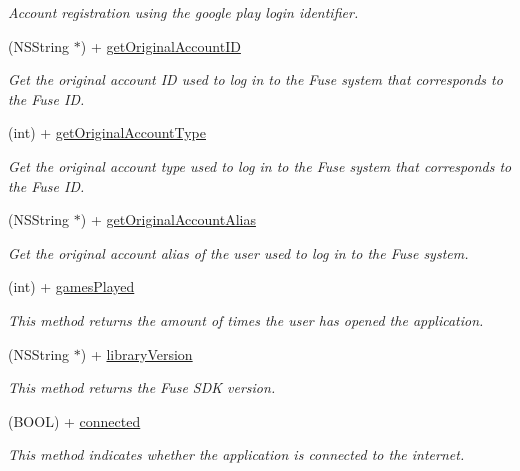 \begin{DoxyCompactItemize}
\begin{DoxyCompactList}\small\item\em Account registration using the google play login identifier. \end{DoxyCompactList}\item 
(N\+S\+String $\ast$) + \hyperlink{interface_fuse_s_d_k_a49b43f13a0efee7d2af60197d0ae341c}{get\+Original\+Account\+I\+D}
\begin{DoxyCompactList}\small\item\em Get the original account I\+D used to log in to the Fuse system that corresponds to the Fuse I\+D. \end{DoxyCompactList}\item 
(int) + \hyperlink{interface_fuse_s_d_k_a0571f2d960109dc9bff59c6575bf2534}{get\+Original\+Account\+Type}
\begin{DoxyCompactList}\small\item\em Get the original account type used to log in to the Fuse system that corresponds to the Fuse I\+D. \end{DoxyCompactList}\item 
(N\+S\+String $\ast$) + \hyperlink{interface_fuse_s_d_k_ab49bb189bd1ebaf871f24a7c4e4b5290}{get\+Original\+Account\+Alias}
\begin{DoxyCompactList}\small\item\em Get the original account alias of the user used to log in to the Fuse system. \end{DoxyCompactList}\item 
(int) + \hyperlink{interface_fuse_s_d_k_afb8604dccdbf7c0b507074a649b75da9}{games\+Played}
\begin{DoxyCompactList}\small\item\em This method returns the amount of times the user has opened the application. \end{DoxyCompactList}\item 
(N\+S\+String $\ast$) + \hyperlink{interface_fuse_s_d_k_a56f5fc3ba2e03d3dbe9d681b3500108a}{library\+Version}
\begin{DoxyCompactList}\small\item\em This method returns the Fuse S\+D\+K version. \end{DoxyCompactList}\item 
(B\+O\+O\+L) + \hyperlink{interface_fuse_s_d_k_a6db77bb2cb4ba38f58666edfa470f7bd}{connected}
\begin{DoxyCompactList}\small\item\em This method indicates whether the application is connected to the internet. \end{DoxyCompactList}\item 

\end{DoxyCompactItemize}
